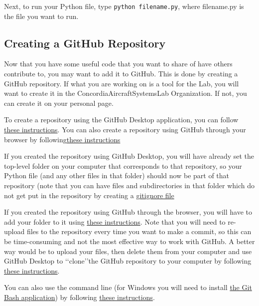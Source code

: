 \documentclass[letterpaper, 12pt]{article}
\begin{document}
Next, to run your Python file, type \lstinline{python filename.py}, where filename.py is the file you want to run. 

\subsection{Creating a GitHub Repository}
Now that you have some useful code that you want to share of have others contribute to, you may want to add it to GitHub. This is done by creating a GitHub repository. If what you are working on is a tool for the Lab, you will want to create it in the ConcordiaAircraftSystemsLab Organization. If not, you can create it on your personal page.

To create a repository using the GitHub Desktop application, you can follow \href{https://help.github.com/en/desktop/getting-started-with-github-desktop/creating-your-first-repository-using-github-desktop}{these instructions}. You can also create a repository using GitHub through your browser by following\href{https://help.github.com/en/github/getting-started-with-github/create-a-repo}{these instructions}

If you created the repository using GitHub Desktop, you will have already set the top-level folder on your computer that corresponds to that repository, so your Python file (and any other files in that folder) should now be part of that repository (note that you can have files and subdirectories in that folder which do not get put in the repository by creating a \href{https://www.freecodecamp.org/news/gitignore-what-is-it-and-how-to-add-to-repo/}{gitignore file}

If you created the repository using GitHub through the browser, you will have to add your folder to it using \href{https://help.github.com/en/github/managing-files-in-a-repository/adding-a-file-to-a-repository}{these instructions}. Note that you will need to re-upload files to the repository every time you want to make a commit, so this can be time-consuming and not the most effective way to work with GitHub. A better way would be to upload your files, then delete them from your computer and use GitHub Desktop to \lq\lq clone\rq\rq the GitHub repository to your computer by following \href{https://help.github.com/en/desktop/contributing-to-projects/cloning-and-forking-repositories-from-github-desktop}{these instructions}.

You can also use the command line (for Windows you will need to install \href{https://gitforwindows.org/}{the Git Bash application}) by following \href{https://help.github.com/en/github/importing-your-projects-to-github/adding-an-existing-project-to-github-using-the-command-line}{these instructions}.
\end{document}
